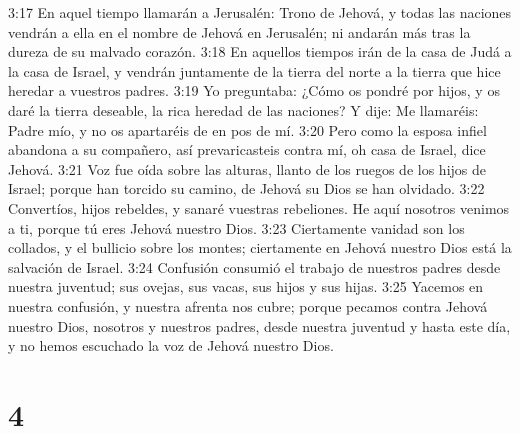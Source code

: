 3:17 En aquel tiempo llamarán a Jerusalén: Trono de Jehová, y todas las naciones vendrán a ella en el nombre de Jehová en Jerusalén; ni andarán más tras la dureza de su malvado corazón.  
3:18 En aquellos tiempos irán de la casa de Judá a la casa de Israel, y vendrán juntamente de la tierra del norte a la tierra que hice heredar a vuestros padres.  
3:19 Yo preguntaba: ¿Cómo os pondré por hijos, y os daré la tierra deseable, la rica heredad de las naciones? Y dije: Me llamaréis: Padre mío, y no os apartaréis de en pos de mí.  
3:20 Pero como la esposa infiel abandona a su compañero, así prevaricasteis contra mí, oh casa de Israel, dice Jehová.  
3:21 Voz fue oída sobre las alturas, llanto de los ruegos de los hijos de Israel; porque han torcido su camino, de Jehová su Dios se han olvidado.  
3:22 Convertíos, hijos rebeldes, y sanaré vuestras rebeliones. He aquí nosotros venimos a ti, porque tú eres Jehová nuestro Dios.  
3:23 Ciertamente vanidad son los collados, y el bullicio sobre los montes; ciertamente en Jehová nuestro Dios está la salvación de Israel.  
3:24 Confusión consumió el trabajo de nuestros padres desde nuestra juventud; sus ovejas, sus vacas, sus hijos y sus hijas.  
3:25 Yacemos en nuestra confusión, y nuestra afrenta nos cubre; porque pecamos contra Jehová nuestro Dios, nosotros y nuestros padres, desde nuestra juventud y hasta este día, y no hemos escuchado la voz de Jehová nuestro Dios.  

\chapter{4}

